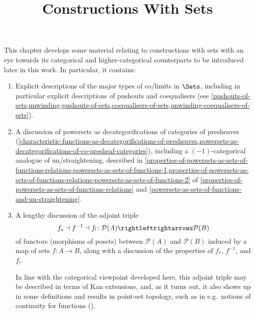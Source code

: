 

%



\title{Constructions With Sets}

\maketitle

\label{section-phantom}

This chapter develops some material relating to constructions with sets with an eye towards its categorical and higher-categorical counterparts to be introduced later in this work. In particular, it contains:
\begin{enumerate}
    \item Explicit descriptions of the major types of co/limits in $\Sets$, including in particular explicit descriptions of pushouts and coequalisers (see \cref{pushouts-of-sets,unwinding-pushouts-of-sets,coequalisers-of-sets,unwinding-coequalisers-of-sets}).
    \item A discussion of powersets as decategorifications of categories of presheaves (\cref{characteristic-functions-as-decategorifications-of-presheaves,powersets-as-decategorifications-of-co-presheaf-categories}), including a $(-1)$-categorical analogue of un/straightening, described in \cref{properties-of-powersets-as-sets-of-functions-relations-powersets-as-sets-of-functions-1,properties-of-powersets-as-sets-of-functions-relations-powersets-as-sets-of-functions-2} of \cref{properties-of-powersets-as-sets-of-functions-relations} and \cref{powersets-as-sets-of-functions-and-un-straightening}.
    \item A lengthy discussion of the adjoint triple%
        \[
            f_{*}\dashv f^{-1}\dashv f_{!}%
            \colon%
            \mathcal{P}(A)%
            \rightleftrightarrows%
            \mathcal{P}(B)%
        \]%
        of functors (morphisms of posets) between $\mathcal{P}(A)$ and $\mathcal{P}(B)$ induced by a map of sets $f\colon A\to B$, along with a discussion of the properties of $f_{*}$, $f^{-1}$, and $f_{!}$.%

        In line with the categorical viewpoint developed here, this adjoint triple may be described in terms of Kan extensions, and, as it turns out, it also shows up in some definitions and results in point-set topology, such as in e.g.\ notions of continuity for functions ().
\end{enumerate}

